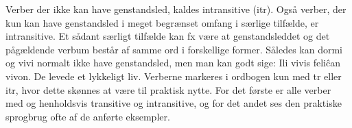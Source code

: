 Verber der ikke kan have genstandsled, kaldes intransitive (itr).
Ogs{\aa} verber, der kun kan have genstandsled i meget begr{\ae}nset omfang i s{\ae}rlige tilf{\ae}lde, er intransitive. Et s{\aa}dant s{\ae}rligt tilf{\ae}lde kan fx v{\ae}re at genstandsleddet og det p{\aa}g{\ae}ldende verbum best{\aa}r af samme ord i forskellige former. S{\aa}ledes kan dormi og vivi normalt ikke have genstandsled, men man kan godt sige: Ili vivis feli\^can vivon. De levede et lykkeligt liv. 
Verberne markeres i ordbogen kun med tr eller itr, hvor dette sk{\o}nnes at v{\ae}re til praktisk nytte. For det f{\o}rste er alle verber med  og  henholdsvis transitive og intransitive, og for det andet ses den praktiske sprogbrug ofte af de anf{\o}rte eksempler.